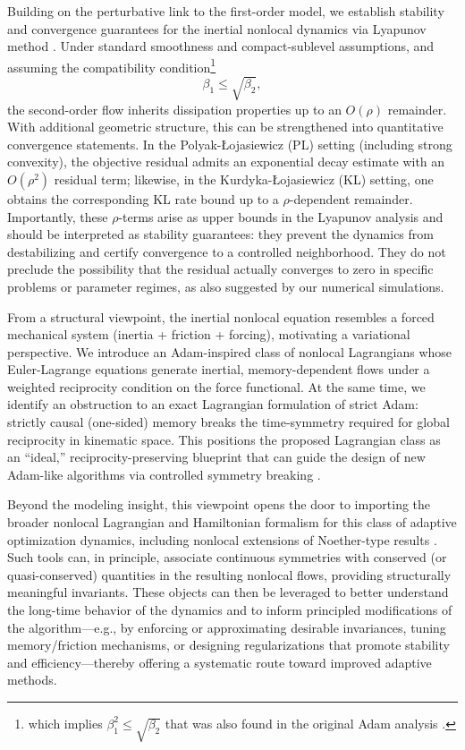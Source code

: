 \documentclass{article} %
\begin{document}
Building on the perturbative link to the first-order model, we establish stability and convergence guarantees for the inertial nonlocal dynamics via Lyapunov method \cite{DaSilva2020}. Under standard smoothness and compact-sublevel assumptions, and assuming the compatibility condition\footnote{which implies $\beta_1^2 \le \sqrt{\beta_2}$ that was also found in the original Adam  analysis \cite{kingma2014}.}
\[
\beta_1 \le \sqrt{\beta_2},
\]
the second-order flow inherits dissipation properties up to an $O(\rho)$ remainder. With additional geometric structure, this can be strengthened into quantitative convergence statements.  In the Polyak-\L{}ojasiewicz (PL) setting (including strong convexity), the objective residual admits an exponential decay estimate with an $O(\rho^2)$ residual term; likewise, in the Kurdyka-\L{}ojasiewicz (KL) setting, one obtains the corresponding KL rate bound up to a $\rho$-dependent remainder. Importantly, these $\rho$-terms arise as upper bounds in the Lyapunov analysis and should be interpreted as stability guarantees: they prevent the dynamics from destabilizing and certify convergence to a controlled neighborhood. 
They do not preclude the possibility that the residual actually converges to zero in specific problems or parameter regimes, as also suggested by our numerical simulations.

From a structural viewpoint, the inertial nonlocal equation resembles a forced mechanical system (inertia + friction + forcing), motivating a variational perspective. We introduce an Adam-inspired class of nonlocal Lagrangians whose Euler-Lagrange equations generate inertial, memory-dependent flows under a weighted reciprocity condition on the force functional. At the same time, we identify an obstruction to an exact Lagrangian formulation of strict Adam: strictly causal (one-sided) memory breaks the time-symmetry required for global reciprocity in kinematic space. This positions the proposed Lagrangian class as an ``ideal,'' reciprocity-preserving blueprint that can guide the design of new Adam-like algorithms via controlled symmetry breaking \cite{tanaka2021noether}.

Beyond the modeling insight, this viewpoint opens the door to importing the broader nonlocal Lagrangian and Hamiltonian formalism for this class of adaptive optimization dynamics, including nonlocal extensions of Noether-type results \cite{heredia2025nonlocalmechanics}. Such tools can, in principle, associate continuous symmetries with conserved (or quasi-conserved) quantities in the resulting nonlocal flows, providing structurally meaningful invariants. These objects can then be leveraged to better understand the long-time behavior of the dynamics and to inform principled modifications of the algorithm---e.g., by enforcing or approximating desirable invariances, tuning memory/friction mechanisms, or designing regularizations that promote stability and efficiency---thereby offering a systematic route toward improved adaptive methods.
\end{document}
